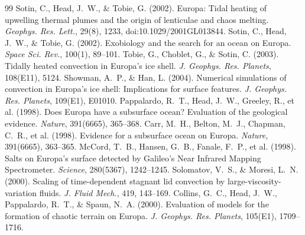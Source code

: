 \documentclass[11pt,a4paper]{article}
\begin{document}
\begin{thebibliography}{99}
 Sotin, C., Head, J.~W., \& Tobie, G. (2002). Europa: Tidal heating of upwelling thermal plumes and the origin of lenticulae and chaos melting. \textit{Geophys. Res. Lett.}, 29(8), 1233, doi:10.1029/2001GL013844.
 Sotin, C., Head, J.~W., \& Tobie, G. (2002). Exobiology and the search for an ocean on Europa. \textit{Space Sci. Rev.}, 100(1), 89--101.
 Tobie, G., Choblet, G., \& Sotin, C. (2003). Tidally heated convection in Europa's ice shell. \textit{J. Geophys. Res. Planets}, 108(E11), 5124.
 Showman, A.~P., \& Han, L. (2004). Numerical simulations of convection in Europa's ice shell: Implications for surface features. \textit{J. Geophys. Res. Planets}, 109(E1), E01010.
 Pappalardo, R.~T., Head, J.~W., Greeley, R., et al. (1998). Does Europa have a subsurface ocean? Evaluation of the geological evidence. \textit{Nature}, 391(6665), 365--368.
 Carr, M.~H., Belton, M.~J., Chapman, C.~R., et al. (1998). Evidence for a subsurface ocean on Europa. \textit{Nature}, 391(6665), 363--365.
 McCord, T.~B., Hansen, G.~B., Fanale, F.~P., et al. (1998). Salts on Europa's surface detected by Galileo's Near Infrared Mapping Spectrometer. \textit{Science}, 280(5367), 1242--1245.
 Solomatov, V.~S., \& Moresi, L.~N. (2000). Scaling of time-dependent stagnant lid convection by large-viscosity-variation fluids. \textit{J. Fluid Mech.}, 419, 143--169.
 Collins, G.~C., Head, J.~W., Pappalardo, R.~T., \& Spaun, N.~A. (2000). Evaluation of models for the formation of chaotic terrain on Europa. \textit{J. Geophys. Res. Planets}, 105(E1), 1709--1716.
\end{thebibliography}
\end{document}
